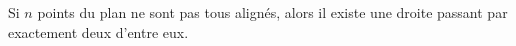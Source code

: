Si $n$ points du plan ne sont pas tous alignés, alors il existe une droite passant par exactement deux d'entre eux.
